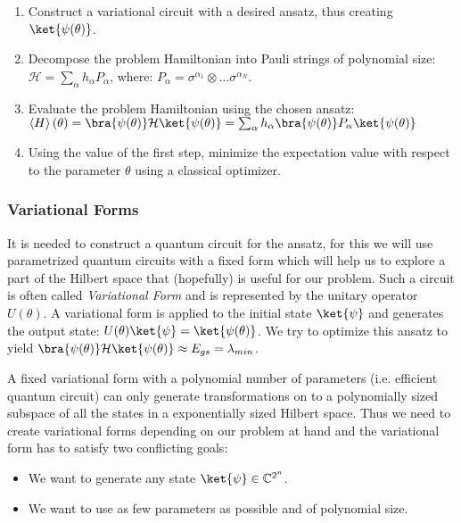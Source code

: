 \begin{enumerate}
    \item Construct a variational circuit with a desired ansatz, thus creating $\ket{\psi(\theta)}$.
    \item Decompose the problem Hamiltonian into Pauli strings of polynomial size: $\mathcal{H} = \sum_\alpha h_\alpha P_\alpha$, where: $P_\alpha = \sigma^{\alpha_1} \otimes \dots \sigma^{\alpha_N}$.
    \item Evaluate the problem Hamiltonian using the chosen ansatz: $\expval{H}(\theta) = \bra{\psi(\theta)} \mathcal{H} \ket{\psi(\theta)} = \sum_\alpha h_\alpha \bra{\psi(\theta)} P_\alpha \ket{\psi(\theta)}$
    \item Using the value of the first step, minimize the expectation value with respect to the parameter $\theta$ using a classical optimizer.
\end{enumerate}

\subsubsection{Variational Forms}
\label{Subsubsec: Variational Forms}

It is needed to construct a quantum circuit for the ansatz, for this we will use parametrized quantum circuits with a fixed form which will help us to explore a part of the Hilbert space that (hopefully) is useful for our problem. Such a circuit is often called \textit{Variational Form} and is represented by the unitary operator $U(\theta)$. A variational form is applied to the initial state $\ket{\psi}$ and generates the output state: $U(\theta)\ket{\psi} = \ket{\psi(\theta)}$. We try to optimize this ansatz to yield $\bra{\psi(\theta)} \mathcal{H} \ket{\psi(\theta)} \approx E_{gs} = \lambda_{min}$. 

A fixed variational form with a polynomial number of parameters (i.e. efficient quantum circuit) can only generate transformations on to a polynomially sized subspace of all the states in a exponentially sized Hilbert space. Thus we need to create variational forms depending on our problem at hand and the variational form has to satisfy two conflicting goals:

\begin{itemize}
    \item We want to generate any state $\ket{\psi} \in \mathbb{C}^{2^n}$.
    \item We want to use as few parameters as possible and of polynomial size.
\end{itemize}

